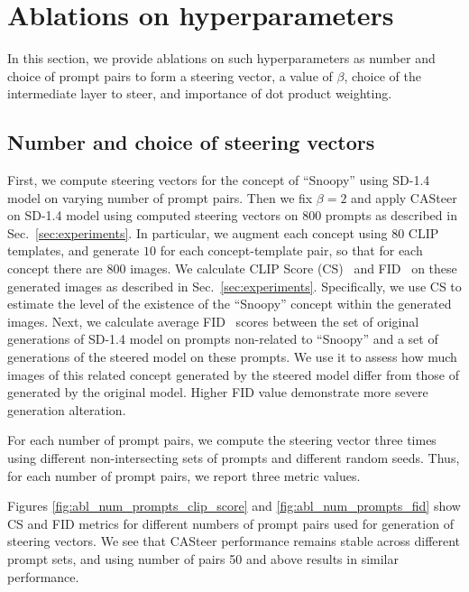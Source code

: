 \clearpage
\section{Ablations on hyperparameters}
\label{sec:ablations}

In this section, we provide ablations on such hyperparameters as number and choice of prompt pairs to form a steering vector, a value of $\beta$, choice of the intermediate layer to steer, and importance of dot product weighting.

\subsection{Number and choice of steering vectors}
\label{ablation_num_vectors}
First, we compute steering vectors for the concept of ``Snoopy'' using SD-1.4 model on varying number of prompt pairs. Then we fix $\beta=2$ and apply CASteer on SD-1.4 model using computed steering vectors on 800 prompts as described in Sec.~\ref{sec:experiments}. In particular, we augment each concept using $80 $ CLIP~\cite{DBLP:conf/icml/RadfordKHRGASAM21} templates, and generate $10$ for each concept-template pair, so that for each concept there are $800$ images. 
%
%
We calculate CLIP Score (CS)~\cite{DBLP:conf/emnlp/HesselHFBC21}  and FID~\cite{DBLP:conf/nips/HeuselRUNH17} on these generated images as described in Sec.~\ref{sec:experiments}. Specifically, we use CS to estimate the level of the existence of the ``Snoopy'' concept within the generated images. Next, we calculate average FID~\cite{DBLP:conf/nips/HeuselRUNH17} scores between the set of original generations of SD-1.4 model on prompts non-related to ``Snoopy'' and a set of generations of the steered model on these prompts. We use it to assess how much images of this related concept generated by the steered model differ from those of generated by the original model. Higher FID value demonstrate more severe generation alteration.

For each number of prompt pairs, we compute the steering vector three times using different non-intersecting sets of prompts and different random seeds. Thus, for each number of prompt pairs, we report three metric values.

Figures \ref{fig:abl_num_prompts_clip_score} and \ref{fig:abl_num_prompts_fid} show CS and FID metrics for different numbers of prompt pairs used for generation of steering vectors. We see that CASteer performance remains stable across different prompt sets, and using number of pairs 50 and above results in similar performance.

